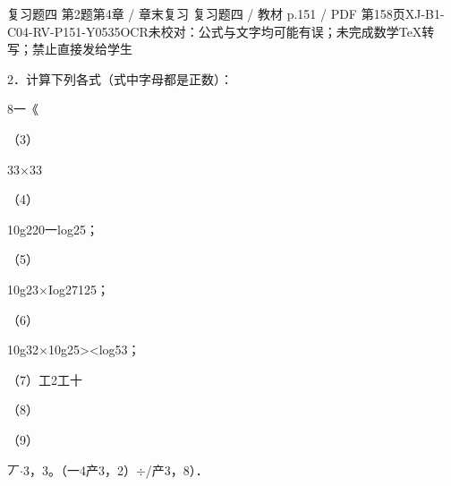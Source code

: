 \begin{bankitem}{复习题四 第2题}{第4章 / 章末复习 复习题四 / 教材 p.151 / PDF 第158页}{XJ-B1-C04-RV-P151-Y0535}{OCR未校对：公式与文字均可能有误；未完成数学TeX转写；禁止直接发给学生}
\begin{ocrdraft}
\par
2．计算下列各式（式中字母都是正数）：
\par
8一《
\par
（3）
\par
33\ensuremath{\times}33
\par
（4）
\par
10g220一log25；
\par
（5）
\par
10g23\ensuremath{\times}Iog27125；
\par
（6）
\par
10g32\ensuremath{\times}10g25><log53；
\par
（7）工2工十
\par
（8）
\par
（9）
\par
丆\ensuremath{\cdot}3，3。（一4产3，2）\ensuremath{\div}/产3，8）．
\end{ocrdraft}
\end{bankitem}
